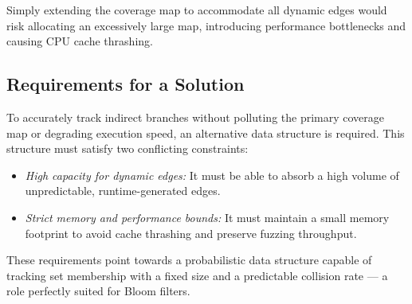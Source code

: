 Simply extending the coverage map to accommodate all dynamic edges would risk allocating an excessively large map, introducing performance bottlenecks and causing CPU cache thrashing.

\subsection{Requirements for a Solution}

To accurately track indirect branches without polluting the primary coverage map or degrading execution speed, an alternative data structure is required. This structure must satisfy two conflicting constraints: 
\begin{itemize}
    \item \textit{High capacity for dynamic edges:} It must be able to absorb a high volume of unpredictable, runtime-generated edges.

    \item \textit{Strict memory and performance bounds:} It must maintain a small memory footprint to avoid cache thrashing and preserve fuzzing throughput.
\end{itemize}

These requirements point towards a probabilistic data structure capable of tracking set membership with a fixed size and a predictable collision rate --- a role perfectly suited for Bloom filters.